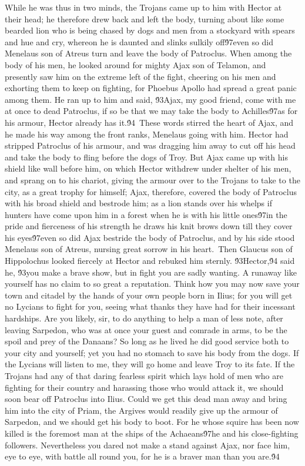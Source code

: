 {While he was thus in two minds, the Trojans came up to him with Hector at their head; he therefore drew back and left the body, turning about like some bearded lion who is being chased by dogs and men from a stockyard with spears and hue and cry, whereon he is daunted and slinks sulkily off\'97even so did Menelaus son of Atreus turn and leave the body of Patroclus. When among the body of his men, he looked around for mighty Ajax son of Telamon, and presently saw him on the extreme left of the fight, cheering on his men and exhorting them to keep on fighting, for Phoebus Apollo had spread a great panic among them. He ran up to him and said, \'93Ajax, my good friend, come with me at once to dead Patroclus, if so be that we may take the body to Achilles\'97as for his armour, Hector already has it.\'94\
These words stirred the heart of Ajax, and he made his way among the front ranks, Menelaus going with him. Hector had stripped Patroclus of his armour, and was dragging him away to cut off his head and take the body to fling before the dogs of Troy. But Ajax came up with his shield like wall before him, on which Hector withdrew under shelter of his men, and sprang on to his chariot, giving the armour over to the Trojans to take to the city, as a great trophy for himself; Ajax, therefore, covered the body of Patroclus with his broad shield and bestrode him; as a lion stands over his whelps if hunters have come upon him in a forest when he is with his little ones\'97in the pride and fierceness of his strength he draws his knit brows down till they cover his eyes\'97even so did Ajax bestride the body of Patroclus, and by his side stood Menelaus son of Atreus, nursing great sorrow in his heart.\
Then Glaucus son of Hippolochus looked fiercely at Hector and rebuked him sternly. \'93Hector,\'94 said he, \'93you make a brave show, but in fight you are sadly wanting. A runaway like yourself has no claim to so great a reputation. Think how you may now save your town and citadel by the hands of your own people born in Ilius; for you will get no Lycians to fight for you, seeing what thanks they have had for their incessant hardships. Are you likely, sir, to do anything to help a man of less note, after leaving Sarpedon, who was at once your guest and comrade in arms, to be the spoil and prey of the Danaans? So long as he lived he did good service both to your city and yourself; yet you had no stomach to save his body from the dogs. If the Lycians will listen to me, they will go home and leave Troy to its fate. If the Trojans had any of that daring fearless spirit which lays hold of men who are fighting for their country and harassing those who would attack it, we should soon bear off Patroclus into Ilius. Could we get this dead man away and bring him into the city of Priam, the Argives would readily give up the armour of Sarpedon, and we should get his body to boot. For he whose squire has been now killed is the foremost man at the ships of the Achaeans\'97he and his close-fighting followers. Nevertheless you dared not make a stand against Ajax, nor face him, eye to eye, with battle all round you, for he is a braver man than you are.\'94\
}
